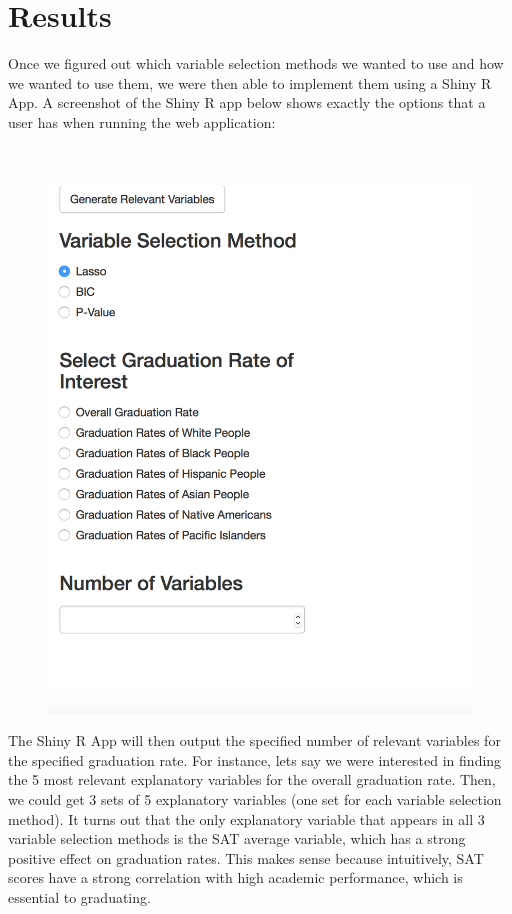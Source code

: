 \documentclass{article}
\begin{document}



\section{Results}
Once we figured out which variable selection methods we wanted to use and how we wanted to use them, we were then able to implement them using a Shiny R App. A screenshot of the Shiny R app below shows exactly the options that a user has when running the web application:\\\\\\

\begin{figure}[!htb]
\includegraphics{../../images/screenshot.png}
\end{figure}


The Shiny R App will then output the specified number of relevant variables for the specified graduation rate. For instance, lets say we were interested in finding the 5 most relevant explanatory variables for the overall graduation rate. Then, we could get 3 sets of 5 explanatory variables (one set for each variable selection method). It turns out that the only explanatory variable that appears in all 3 variable selection methods is the SAT average variable, which has a strong positive effect on graduation rates. This makes sense because intuitively, SAT scores have a strong correlation with high academic performance, which is essential to graduating. 
\end{document}
